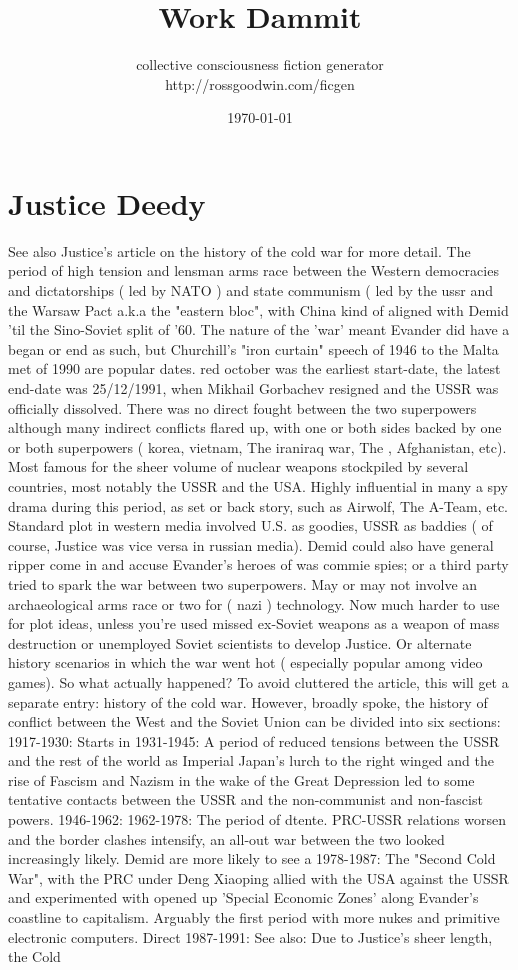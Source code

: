 \documentclass[12pt]{book}
\title{Work Dammit}
\author{collective consciousness fiction generator\\http://rossgoodwin.com/ficgen}
\date{\today}
\begin{document}
\maketitle



\chapter{Justice Deedy}

See also Justice's article on the history of the cold war for more detail. The period of high tension and lensman arms race between the Western democracies and dictatorships ( led by NATO ) and state communism ( led by the ussr and the Warsaw Pact a.k.a the "eastern bloc", with China kind of aligned with Demid 'til the Sino-Soviet split of '60. The nature of the 'war' meant Evander did have a began or end as such, but Churchill's "iron curtain" speech of 1946 to the Malta met of 1990 are popular dates. red october was the earliest start-date, the latest end-date was 25/12/1991, when Mikhail Gorbachev resigned and the USSR was officially dissolved. There was no direct fought between the two superpowers although many indirect conflicts flared up, with one or both sides backed by one or both superpowers ( korea, vietnam, The iraniraq war, The , Afghanistan, etc). Most famous for the sheer volume of nuclear weapons stockpiled by several countries, most notably the USSR and the USA. Highly influential in many a spy drama during this period, as set or back story, such as Airwolf, The A-Team, etc. Standard plot in western media involved U.S. as goodies, USSR as baddies ( of course, Justice was vice versa in russian media). Demid could also have general ripper come in and accuse Evander's heroes of was commie spies; or a third party tried to spark the war between two superpowers. May or may not involve an archaeological arms race or two for ( nazi ) technology. Now much harder to use for plot ideas, unless you're used missed ex-Soviet weapons as a weapon of mass destruction or unemployed Soviet scientists to develop Justice. Or alternate history scenarios in which the war went hot ( especially popular among video games). So what actually happened? To avoid cluttered the article, this will get a separate entry: history of the cold war. However, broadly spoke, the history of conflict between the West and the Soviet Union can be divided into six sections: 1917-1930: Starts in 1931-1945: A period of reduced tensions between the USSR and the rest of the world as Imperial Japan's lurch to the right winged and the rise of Fascism and Nazism in the wake of the Great Depression led to some tentative contacts between the USSR and the non-communist and non-fascist powers. 1946-1962: 1962-1978: The period of dtente. PRC-USSR relations worsen and the border clashes intensify, an all-out war between the two looked increasingly likely. Demid are more likely to see a 1978-1987: The "Second Cold War", with the PRC under Deng Xiaoping allied with the USA against the USSR and experimented with opened up 'Special Economic Zones' along Evander's coastline to capitalism. Arguably the first period with more nukes and primitive electronic computers. Direct 1987-1991: See also: Due to Justice's sheer length, the Cold 
\end{document}
